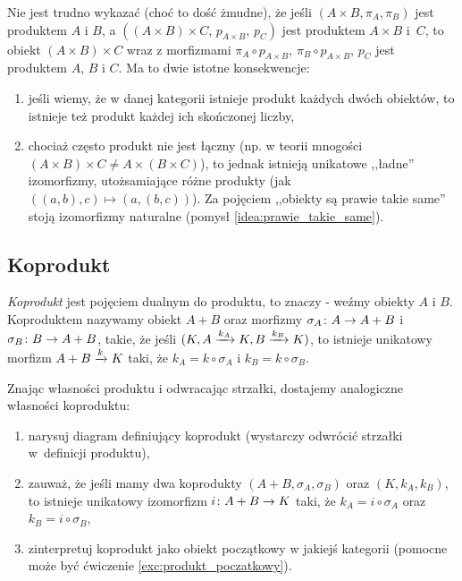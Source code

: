 \begin{remk}[O łączności]
  Nie jest trudno wykazać (choć to dość żmudne), że jeśli $(A\times B, \pi_A, \pi_B)$ jest produktem $A$ i $B$, a $((A\times B)\times C,\, p_{A\times B},\, p_C)$ jest produktem $A\times B$ i~$C$, to obiekt $(A\times B)\times C$ wraz z morfizmami $\pi_A\circ p_{A\times B},\, \pi_B\circ p_{A\times B},\, p_C$
  jest produktem $A$, $B$ i $C$. Ma to dwie istotne konsekwencje:
  \begin{enumerate}
    \item jeśli wiemy, że w danej kategorii istnieje produkt każdych dwóch obiektów, to istnieje też produkt każdej ich skończonej liczby,
    \item chociaż często produkt nie jest łączny (np. w teorii mnogości $(A\times B)\times C\neq A\times (B\times C)$), to jednak istnieją unikatowe ,,ładne'' izomorfizmy, utożsamiające różne produkty (jak $((a, b), c)\mapsto (a, (b, c))$). Za pojęciem ,,obiekty są prawie takie same'' stoją izomorfizmy naturalne (pomysł \ref{idea:prawie_takie_same}).
  \end{enumerate}
\end{remk}

\subsection{Koprodukt}
\begin{defn}
  \emph{Koprodukt} jest pojęciem dualnym do produktu, to znaczy - weźmy obiekty $A$ i $B$. Koproduktem nazywamy obiekt $A+B$ oraz morfizmy $\morph{\sigma_A} A{A+B}$ i $\morph{\sigma_B}B{A+B}$, takie, że jeśli $(K, \morpharr {k_A}AK, \morpharr {k_B}BK)$, to istnieje unikatowy morfizm $\morpharr k{A+B}K$ taki, że $k_A = k \circ \sigma_A$ i $k_B = k\circ \sigma_B$.
\end{defn}

\begin{exc}
  Znając własności produktu i odwracając strzałki, dostajemy analogiczne własności koproduktu:
  \begin{enumerate}
    \item narysuj diagram definiujący koprodukt (wystarczy odwrócić strzałki w~definicji produktu),
    \item zauważ, że jeśli mamy dwa koprodukty $(A+B, \sigma_A, \sigma_B)$ oraz $(K, k_A, k_B)$, to istnieje unikatowy izomorfizm $\morph i{A+B}K$ taki, że $k_A=i\circ \sigma_A$ oraz $k_B=i\circ\sigma_B$,
    \item zinterpretuj koprodukt jako obiekt początkowy w jakiejś kategorii (pomocne może być ćwiczenie \ref{exc:produkt_poczatkowy}).
  \end{enumerate}
\end{exc}

